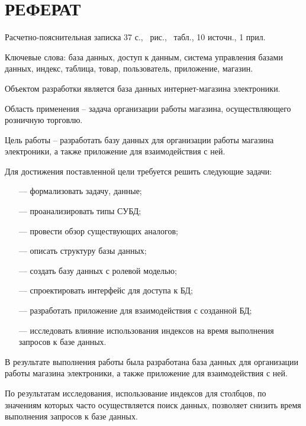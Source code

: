\section*{РЕФЕРАТ}

Расчетно-пояснительная записка 37 с., \totalfigures\ рис., \totaltables\ табл., 10 источн., 1 прил.

Ключевые слова: база данных, доступ к данным, система управления базами данных, индекс, таблица, товар, пользователь, приложение, магазин.

Объектом разработки является база данных интернет-магазина электроники.

Область применения -- задача организации работы магазина, осуществляющего розничную торговлю.

Цель работы -- разработать базу данных для организации работы магазина электроники, а также приложение для взаимодействия с ней.

Для достижения поставленной цели требуется решить следующие задачи:

\begin{itemize}[leftmargin=0.7cm +  - ]
	\item[---] формализовать задачу, данные;
	\item[---] проанализировать типы СУБД;
	\item[---] провести обзор существующих аналогов;
	\item[---] описать структуру базы данных;
	\item[---] создать базу данных с ролевой моделью;
	\item[---] спроектировать интерфейс для доступа к БД;
	\item[---] разработать приложение для взаимодействия с созданной БД;
	\item[---] исследовать влияние использования индексов на время выполнения запросов к базе данных.
\end{itemize}

В результате выполнения работы была разработана база данных для организации работы магазина электроники, а также приложение для взаимодействия с ней.

По результатам исследования, использование индексов для столбцов, по значениям которых часто осуществляется поиск данных, позволяет снизить время выполнения запросов к базе данных.

\pagebreak